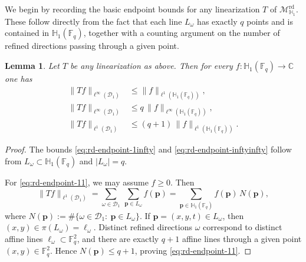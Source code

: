 \documentclass[11pt]{article}
\newtheorem{lemma}[theorem]{Lemma}
\newcommand{\1}{\mathbf 1}
\begin{document}
We begin by recording the basic endpoint bounds for any linearization $T$ of 
$\mathcal{M}^{\mathrm{rd}}_{\mathbb{H}_1}$. These follow directly from the fact 
that each line $L_\omega$ has exactly $q$ points and is contained in 
$\mathbb{H}_1(\mathbb{F}_q)$, together with a counting argument on the number of 
refined directions passing through a given point.
\begin{lemma}\label{lem:rd-endpoints}
Let $T$ be any linearization as above. Then for every $f:\mathbb H_1(\mathbb F_q)\to\mathbb C$ one has
\begin{align}
\|Tf\|_{\ell^\infty(\mathcal D_1)} &\le \|f\|_{\ell^1(\mathbb H_1(\mathbb F_q))},\label{eq:rd-endpoint-1infty}\\
\|Tf\|_{\ell^\infty(\mathcal D_1)} &\le q\,\|f\|_{\ell^\infty(\mathbb H_1(\mathbb F_q))},\label{eq:rd-endpoint-inftyinfty}\\
\|Tf\|_{\ell^1(\mathcal D_1)} &\le (q+1)\,\|f\|_{\ell^1(\mathbb H_1(\mathbb F_q))}.\label{eq:rd-endpoint-11}
\end{align}
\end{lemma}

\begin{proof}
The bounds \eqref{eq:rd-endpoint-1infty} and \eqref{eq:rd-endpoint-inftyinfty} follow from
$L_\omega\subset \mathbb H_1(\mathbb F_q)$ and $|L_\omega|=q$.

For \eqref{eq:rd-endpoint-11}, we may assume $f\ge 0$.
Then
\[
\|Tf\|_{\ell^1(\mathcal D_1)}
=
\sum_{\omega\in\mathcal D_1}\ \sum_{\mathbf p\in L_\omega} f(\mathbf p)
=
\sum_{\mathbf p\in\mathbb H_1(\mathbb F_q)} f(\mathbf p)\,N(\mathbf p),
\]
where $N(\mathbf p):=\#\{\omega\in\mathcal D_1:\ \mathbf p\in L_\omega\}$.
If $\mathbf p=(x,y,t)\in L_\omega$, then $(x,y)\in \pi(L_\omega)=\ell_\omega$.
Distinct refined directions $\omega$ correspond to distinct affine lines $\ell_\omega\subset\mathbb F_q^2$,
and there are exactly $q+1$ affine lines through a given point $(x,y)\in\mathbb F_q^2$.
Hence $N(\mathbf p)\le q+1$, proving \eqref{eq:rd-endpoint-11}.
\end{proof}
\end{document}
